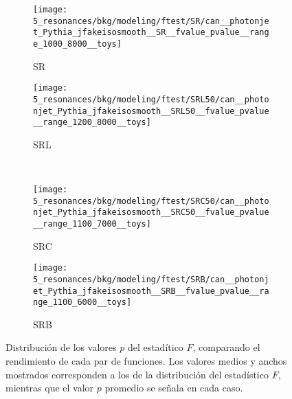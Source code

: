 \begin{figure}[ht!]
    \centering
    \begin{subfigure}[h]{0.49\linewidth}
        \centering
        \texttt{[image: 5\_resonances/bkg/modeling/ftest/SR/can\_\_photonjet\_Pythia\_jfakeisosmooth\_\_SR\_\_fvalue\_pvalue\_\_range\_1000\_8000\_\_toys]}
        \caption{SR}
    \end{subfigure}
    \begin{subfigure}[h]{0.49\linewidth}
        \centering
        \texttt{[image: 5\_resonances/bkg/modeling/ftest/SRL50/can\_\_photonjet\_Pythia\_jfakeisosmooth\_\_SRL50\_\_fvalue\_pvalue\_\_range\_1200\_8000\_\_toys]}
        \caption{SRL}
    \end{subfigure}
    \\
    \begin{subfigure}[h]{0.49\linewidth}
        \centering
        \texttt{[image: 5\_resonances/bkg/modeling/ftest/SRC50/can\_\_photonjet\_Pythia\_jfakeisosmooth\_\_SRC50\_\_fvalue\_pvalue\_\_range\_1100\_7000\_\_toys]}
        \caption{SRC}
    \end{subfigure}
    \begin{subfigure}[h]{0.49\linewidth}
        \centering
        \texttt{[image: 5\_resonances/bkg/modeling/ftest/SRB/can\_\_photonjet\_Pythia\_jfakeisosmooth\_\_SRB\_\_fvalue\_pvalue\_\_range\_1100\_6000\_\_toys]}
        \caption{SRB}
    \end{subfigure}
    \caption{Distribución de los valores \(p\) del estadítico \(F\), comparando el rendimiento de cada par de funciones. Los valores medios y anchos mostrados corresponden a los de la distribución del estadístico \(F\), mientras que el valor \(p\) promedio se se\~nala en cada caso.}
    \label{fig:bkg:modeling:preparation:ftest:ftest_pvalue}
\end{figure}

